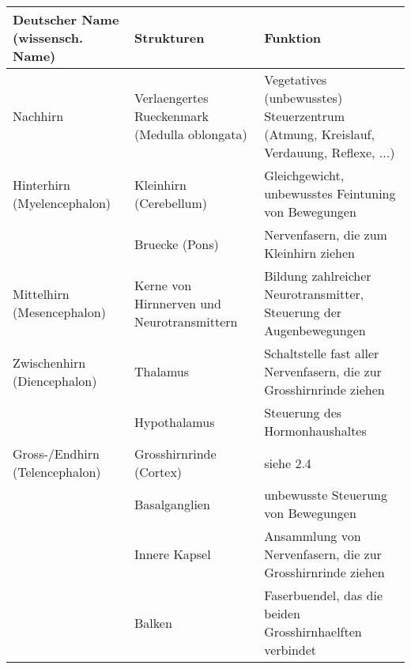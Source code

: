 \begin{table}[h]
\begin{tabularx}{\textwidth}{XXX}
\hline\hline

Deutscher Name \newline(wissensch. Name)\newline              & Strukturen                                    & Funktion                                                                             \\ \hline
Nachhirn                                      & Verlaengertes Rueckenmark (Medulla oblongata) & Vegetatives (unbewusstes) Steuerzentrum (Atmung, Kreislauf, Verdauung, Reflexe, ...) \\ \hline
Hinterhirn \newline(Myelencephalon)               & Kleinhirn (Cerebellum)                        & Gleichgewicht, unbewusstes Feintuning von Bewegungen                                 \\ \cline{2-3} 
                                          & Bruecke (Pons)                                & Nervenfasern, die zum Kleinhirn ziehen                                               \\ \hline
Mittelhirn \newline(Mesencephalon)                    & Kerne von Hirnnerven und Neurotransmittern    & Bildung zahlreicher Neurotransmitter, Steuerung der Augenbewegungen                  \\ \hline
Zwischenhirn \newline(Diencephalon)                   & Thalamus                                      & Schaltstelle fast aller Nervenfasern, die zur Grosshirnrinde ziehen                   \\ \cline{2-3} 
                                              & Hypothalamus                                  & Steuerung des Hormonhaushaltes                                                       \\ \hline
Gross-/Endhirn \newline(Telencephalon)                 & Grosshirnrinde (Cortex)                        & siehe 2.4                                                                            \\ \cline{2-3} 
                                              & Basalganglien                                 & unbewusste Steuerung von Bewegungen                                                  \\ \cline{2-3} 
                                              & Innere Kapsel                                 & Ansammlung von Nervenfasern, die zur Grosshirnrinde ziehen                            \\ \cline{2-3} 
                                              & Balken                                        & Faserbuendel, das die beiden Grosshirnhaelften verbindet                              \\ \hline\hline
\end{tabularx}
\end{table}



